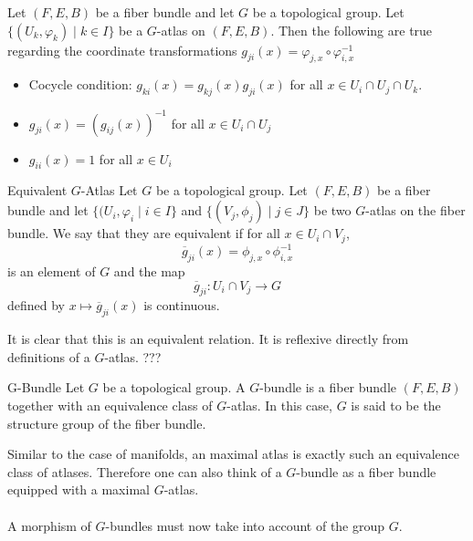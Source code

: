 \documentclass[a4paper]{article}
\begin{document}
\begin{lmm}{}{} Let $(F,E,B)$ be a fiber bundle and let $G$ be a topological group. Let $\{(U_k,\varphi_k)\;|\;k\in I\}$ be a $G$-atlas on $(F,E,B)$. Then the following are true regarding the coordinate transformations $g_{ji}(x)=\varphi_{j,x}\circ\varphi_{i,x}^{-1}$
\begin{itemize}
\item Cocycle condition: $g_{ki}(x)=g_{kj}(x)g_{ji}(x)$ for all $x\in U_i\cap U_j\cap U_k$. 
\item $g_{ji}(x)=(g_{ij}(x))^{-1}$ for all $x\in U_i\cap U_j$
\item $g_{ii}(x)=1$ for all $x\in U_i$
\end{itemize}
\end{lmm}

\begin{defn}{Equivalent $G$-Atlas}{} Let $G$ be a topological group. Let $(F,E,B)$ be a fiber bundle and let $\{(U_i,\varphi_i\;|\;i\in I\}$ and $\{(V_j,\phi_j)\;|\;j\in J\}$ be two $G$-atlas on the fiber bundle. We say that they are equivalent if for all $x\in U_i\cap V_j$, $$\overline{g}_{ji}(x)=\phi_{j,x}\circ\phi_{i,x}^{-1}$$ is an element of $G$ and the map $$\overline{g}_{ji}:U_i\cap V_j\to G$$ defined by $x\mapsto\overline{g}_{ji}(x)$ is continuous. 
\end{defn}

It is clear that this is an equivalent relation. It is reflexive directly from definitions of a $G$-atlas. ???

\begin{defn}{G-Bundle}{} Let $G$ be a topological group. A $G$-bundle is a fiber bundle $(F,E,B)$ together with an equivalence class of $G$-atlas. In this case, $G$ is said to be the structure group of the fiber bundle. 
\end{defn}

Similar to the case of manifolds, an maximal atlas is exactly such an equivalence class of atlases. Therefore one can also think of a $G$-bundle as a fiber bundle equipped with a maximal $G$-atlas. \\~\\

A morphism of $G$-bundles must now take into account of the group $G$. 
\end{document}
